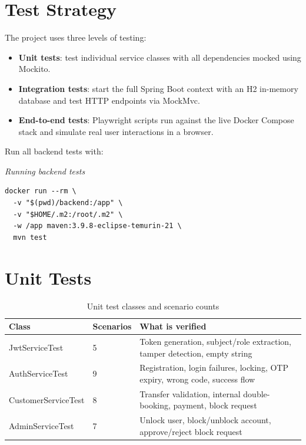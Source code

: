 \documentclass[12pt,a4paper]{report}
\begin{document}
\section{Test Strategy}

The project uses three levels of testing:
\begin{itemize}[noitemsep]
  \item \textbf{Unit tests}: test individual service classes with all dependencies
        mocked using Mockito.
  \item \textbf{Integration tests}: start the full Spring Boot context with an H2
        in-memory database and test HTTP endpoints via MockMvc.
  \item \textbf{End-to-end tests}: Playwright scripts run against the live Docker
        Compose stack and simulate real user interactions in a browser.
\end{itemize}

Run all backend tests with:

\textit{\small Running backend tests}\vspace{2pt}
\begin{Verbatim}[frame=single,fontsize=\small,bgcolor=codegray]
docker run --rm \
  -v "$(pwd)/backend:/app" \
  -v "$HOME/.m2:/root/.m2" \
  -w /app maven:3.9.8-eclipse-temurin-21 \
  mvn test
\end{Verbatim}


\section{Unit Tests}

\begin{table}[H]
  \centering
  \caption{Unit test classes and scenario counts}
  \begin{tabular}{lll}
    \toprule
    \textbf{Class} & \textbf{Scenarios} & \textbf{What is verified} \\
    \midrule
    JwtServiceTest       & 5 & Token generation, subject/role extraction,
                               tamper detection, empty string \\
    AuthServiceTest      & 9 & Registration, login failures, locking,
                               OTP expiry, wrong code, success flow \\
    CustomerServiceTest  & 8 & Transfer validation, internal double-booking,
                               payment, block request \\
    AdminServiceTest     & 7 & Unlock user, block/unblock account,
                               approve/reject block request \\
    \bottomrule
  \end{tabular}
\end{table}
\end{document}

